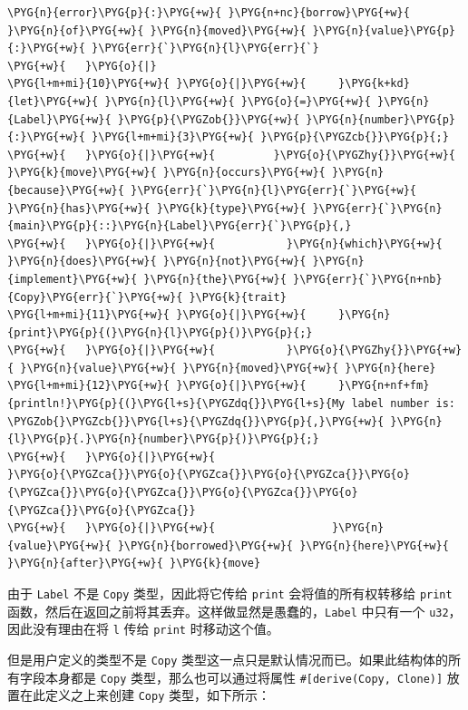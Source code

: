 \begin{Verbatim}[commandchars=\\\{\},breaklines=true,breakanywhere=true,fontsize=\codefont,xleftmargin=17bp]
\PYG{n}{error}\PYG{p}{:}\PYG{+w}{ }\PYG{n+nc}{borrow}\PYG{+w}{ }\PYG{n}{of}\PYG{+w}{ }\PYG{n}{moved}\PYG{+w}{ }\PYG{n}{value}\PYG{p}{:}\PYG{+w}{ }\PYG{err}{`}\PYG{n}{l}\PYG{err}{`}
\PYG{+w}{   }\PYG{o}{|}
\PYG{l+m+mi}{10}\PYG{+w}{ }\PYG{o}{|}\PYG{+w}{     }\PYG{k+kd}{let}\PYG{+w}{ }\PYG{n}{l}\PYG{+w}{ }\PYG{o}{=}\PYG{+w}{ }\PYG{n}{Label}\PYG{+w}{ }\PYG{p}{\PYGZob{}}\PYG{+w}{ }\PYG{n}{number}\PYG{p}{:}\PYG{+w}{ }\PYG{l+m+mi}{3}\PYG{+w}{ }\PYG{p}{\PYGZcb{}}\PYG{p}{;}
\PYG{+w}{   }\PYG{o}{|}\PYG{+w}{         }\PYG{o}{\PYGZhy{}}\PYG{+w}{ }\PYG{k}{move}\PYG{+w}{ }\PYG{n}{occurs}\PYG{+w}{ }\PYG{n}{because}\PYG{+w}{ }\PYG{err}{`}\PYG{n}{l}\PYG{err}{`}\PYG{+w}{ }\PYG{n}{has}\PYG{+w}{ }\PYG{k}{type}\PYG{+w}{ }\PYG{err}{`}\PYG{n}{main}\PYG{p}{::}\PYG{n}{Label}\PYG{err}{`}\PYG{p}{,}
\PYG{+w}{   }\PYG{o}{|}\PYG{+w}{           }\PYG{n}{which}\PYG{+w}{ }\PYG{n}{does}\PYG{+w}{ }\PYG{n}{not}\PYG{+w}{ }\PYG{n}{implement}\PYG{+w}{ }\PYG{n}{the}\PYG{+w}{ }\PYG{err}{`}\PYG{n+nb}{Copy}\PYG{err}{`}\PYG{+w}{ }\PYG{k}{trait}
\PYG{l+m+mi}{11}\PYG{+w}{ }\PYG{o}{|}\PYG{+w}{     }\PYG{n}{print}\PYG{p}{(}\PYG{n}{l}\PYG{p}{)}\PYG{p}{;}
\PYG{+w}{   }\PYG{o}{|}\PYG{+w}{           }\PYG{o}{\PYGZhy{}}\PYG{+w}{ }\PYG{n}{value}\PYG{+w}{ }\PYG{n}{moved}\PYG{+w}{ }\PYG{n}{here}
\PYG{l+m+mi}{12}\PYG{+w}{ }\PYG{o}{|}\PYG{+w}{     }\PYG{n+nf+fm}{println!}\PYG{p}{(}\PYG{l+s}{\PYGZdq{}}\PYG{l+s}{My label number is: \PYGZob{}\PYGZcb{}}\PYG{l+s}{\PYGZdq{}}\PYG{p}{,}\PYG{+w}{ }\PYG{n}{l}\PYG{p}{.}\PYG{n}{number}\PYG{p}{)}\PYG{p}{;}
\PYG{+w}{   }\PYG{o}{|}\PYG{+w}{                                        }\PYG{o}{\PYGZca{}}\PYG{o}{\PYGZca{}}\PYG{o}{\PYGZca{}}\PYG{o}{\PYGZca{}}\PYG{o}{\PYGZca{}}\PYG{o}{\PYGZca{}}\PYG{o}{\PYGZca{}}\PYG{o}{\PYGZca{}}
\PYG{+w}{   }\PYG{o}{|}\PYG{+w}{                  }\PYG{n}{value}\PYG{+w}{ }\PYG{n}{borrowed}\PYG{+w}{ }\PYG{n}{here}\PYG{+w}{ }\PYG{n}{after}\PYG{+w}{ }\PYG{k}{move}
\end{Verbatim}

由于 \texttt{Label} 不是 \texttt{Copy} 类型，因此将它传给 \texttt{print} 会将值的所有权转移给 \texttt{print} 函数，然后在返回之前将其丢弃。这样做显然是愚蠢的，\texttt{Label} 中只有一个 \texttt{u32}，因此没有理由在将 \texttt{l} 传给 \texttt{print} 时移动这个值。

但是用户定义的类型不是 \texttt{Copy} 类型这一点只是默认情况而已。如果此结构体的所有字段本身都是 \texttt{Copy} 类型，那么也可以通过将属性 \texttt{\#[derive(Copy, Clone)]} 放置在此定义之上来创建 \texttt{Copy} 类型，如下所示：


